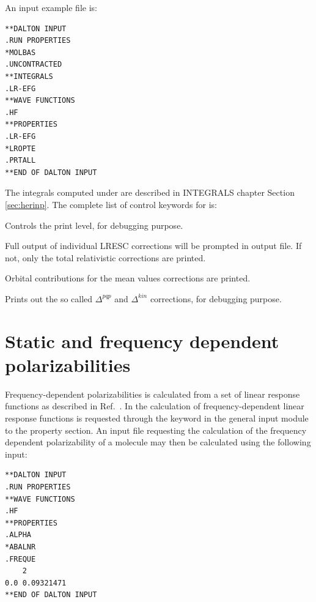 An input example file is:

\begin{verbatim}
**DALTON INPUT
.RUN PROPERTIES
*MOLBAS
.UNCONTRACTED
**INTEGRALS
.LR-EFG
**WAVE FUNCTIONS
.HF
**PROPERTIES
.LR-EFG
*LROPTE
.PRTALL
**END OF DALTON INPUT
\end{verbatim}

The integrals computed under  are described in INTEGRALS chapter Section \ref{sec:herinp}.
The complete list of control keywords for  is:

\begin{list}{}{\itemsep 0.10cm \parsep 0.0cm}
\item[\Key{PRINT}] Controls the print level, for debugging purpose.
\item[\Key{PRTALL}] Full output of individual LRESC corrections will be prompted in output file. If not, only the total relativistic corrections are printed. 
\item[\Key{ORBCON}] Orbital contributions for the mean values corrections are printed.
\item[\Key{PQPKIN}] Prints out the so called $\Delta^{pqp}$ and $\Delta^{kin}$ corrections, for debugging purpose.
\end{list}

\section{Static and frequency dependent
polarizabilities}\label{sec:polari}

Frequency-dependent polarizabilities is
calculated from a set of linear
response functions as
described in Ref.~\cite{jopjjcp82}. In {\aba} the
calculation of frequency-dependent linear response functions is
requested through the keyword  in the general input
module to the property section. An input file requesting the calculation of the frequency
dependent polarizability of a molecule may then be calculated using
the following input:

\begin{verbatim}
**DALTON INPUT
.RUN PROPERTIES
**WAVE FUNCTIONS
.HF
**PROPERTIES
.ALPHA
*ABALNR
.FREQUE
    2
0.0 0.09321471
**END OF DALTON INPUT
\end{verbatim}

